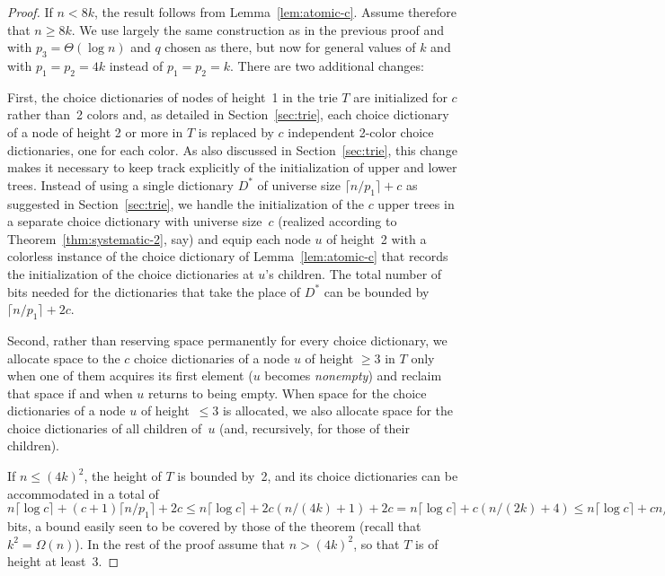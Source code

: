 \documentclass[envcountsame,envcountsect,undated,nolinenumbers]{lnthi}
\def\Tceil#1{\lceil #1\rceil}
\begin{document}
\begin{proof}
If $n<8 k$, the result follows
from Lemma~\ref{lem:atomic-c}.
Assume therefore that $n\ge 8 k$.
We use largely the same construction as in the previous proof
and with $p_3=\Theta(\log n)$ and $q$ chosen as there, but 
now for general values of $k$ and with $p_1=p_2=4 k$
instead of $p_1=p_2=k$.
There are two additional changes:

First, the choice
dictionaries of nodes of height~1
in the trie $T$ are initialized for $c$ rather
than~2 colors and, as detailed in
Section~\ref{sec:trie}, each choice dictionary
of a node of height 2 or more in $T$
is replaced by $c$ independent 2-color
choice dictionaries, one for each color.
As also discussed in Section~\ref{sec:trie},
this change makes it necessary to keep track
explicitly of the initialization of
upper and lower trees.
Instead of using a single dictionary $D^*$
of universe size $\Tceil{n/{p_1}}+c$ as
suggested in Section~\ref{sec:trie},
we handle the initialization of the
$c$ upper trees in a separate choice
dictionary with universe size~$c$
(realized according to Theorem~\ref{thm:systematic-2}, say)
and equip each node $u$ of height~2 with
a colorless instance of the choice dictionary 
of Lemma~\ref{lem:atomic-c}
that records the initialization
of the choice dictionaries at $u$'s children.
The total number of bits needed for the
dictionaries that take the place of $D^*$
can be bounded by
$\Tceil{n/{p_1}}+2 c$.

Second, rather than reserving space
permanently for every choice dictionary,
we allocate space to the $c$ choice dictionaries
of a node $u$ of height $\ge 3$ in $T$
only when one of them acquires its first element
($u$ becomes \emph{nonempty}) and reclaim that
space if and when $u$ returns to being empty.
When space for the choice dictionaries of a node $u$ of
height~$\le 3$ is allocated, we also allocate space for the
choice dictionaries of all children of~$u$
(and, recursively, for those of their children).

If $n\le (4 k)^2$, the height of $T$ is bounded by~2,
and its choice dictionaries can be accommodated
in a total of 
$n\Tceil{\log c}+(c+1)\Tceil{n/{p_1}}+2 c
\le n\Tceil{\log c}+2 c({n/{(4 k)}}+1)+2 c
=n\Tceil{\log c}+c({n/{(2 k)}}+4)
\le n\Tceil{\log c}+{{c n}/k}$ bits,
a bound easily seen to be covered
by those of the theorem (recall that $k^2=\Omega(n)$).
In the rest of the proof assume that $n>(4 k)^2$,
so that $T$ is of height at least~3.
 

\end{proof}
\end{document}
